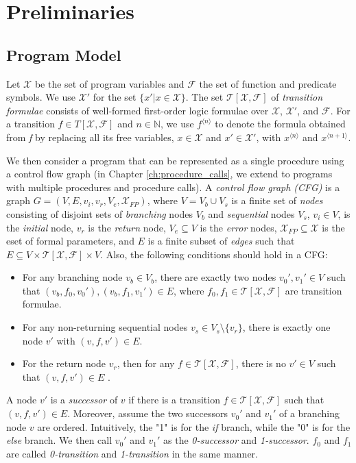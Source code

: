 
\chapter{Preliminaries}\label{ch:preliminaries}

\section{Program Model}\label{sec:model}

Let $\mathcal{X}$ be the set of program variables and $\mathcal{F}$ the set of function and predicate symbols. We use $\mathcal{X'}$ for the set $\{x'| x \in \mathcal{X}\}$. The set $\mathcal{T}[\mathcal{X}, \mathcal{F}]$ of \textit{transition formulae} consists of well-formed first-order logic formulae over $\mathcal{X}$, $\mathcal{X'}$, and $\mathcal{F}$. For a transition $f \in {T}[\mathcal{X}, \mathcal{F}]$ and $\mathit{n} \in \mathbb{N}$, we use $f^{\langle n \rangle}$ to denote the formula obtained from \textit{f} by replacing all its free variables, $x \in \mathcal{X}$ and $x' \in \mathcal{X'}$, with $x^{ \langle n \rangle }$ and $x^{\langle n+1 \rangle }$. 


We then consider a program that can be represented as a single procedure using a control flow graph (in Chapter \ref{ch:procedure_calls}, we extend to programs with multiple procedures and procedure calls). A \emph{control flow graph (CFG)} is a graph $G = (V, E, v_i, v_r, V_e, \mathcal{X}_{FP})$, where $V = V_b \cup V_s$ is a finite set of \emph{nodes} consisting of disjoint sets of \emph{branching} nodes $V_b$ and \emph{sequential} nodes $V_s$, $v_i \in V$, is the \emph{initial} node, $v_r$ is the \emph{return} node, $V_e \subseteq V$ is the \emph{error} nodes, $\mathcal{X}_{FP} \subseteq \mathcal{X}$ is the eset of formal parameters, and $E$ is a finite subset of \emph{edges} such that $E \subseteq V \times \mathcal{T[X,F]} \times V$. Also, the following conditions should hold in a CFG:
\begin{itemize}
	\item For any branching node $v_b \in V_b$, there are exactly two nodes $v_0' , v_1' \in V$ such that $(v_b, f_0, v_0'), (v_b, f_1, v_1') \in E$, where $f_0, f_1 \in \mathcal{T[X,F]}$ are transition formulae.
	
	\item For any non-returning sequential nodes $v_s \in V_s \setminus \{v_r\}$, there is exactly one node $v'$ with $(v, f, v') \in E$.
	
	\item For the return node $v_r$, then for any $f \in \mathcal{T[X,F]}$, there is no $v' \in V$ such that $(v, f, v') \in E$ .
\end{itemize}
A node $v'$ is a \emph{successor} of $v$ if there is a transition $f \in \mathcal{T[X,F]}$ such that $(v, f, v') \in E$. Moreover, assume the two successors $v_0'$ and $v_1'$ of a branching node $v$ are ordered. Intuitively, the "1" is for the \emph{if} branch, while the "0" is for the \emph{else} branch. We then call $v_0'$ and $v_1'$ as the \emph{0-successor} and \emph{1-successor}. $f_0$ and $f_1$ are called \emph{0-transition} and \emph{1-transition} in the same manner. 

